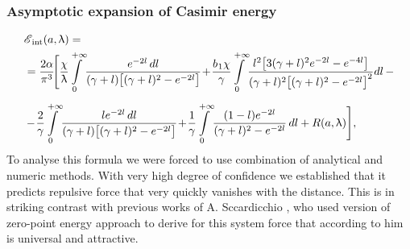 \documentclass[10pt,t]{beamer}
\begin{document}
\begin{frame}
  \frametitle{Asymptotic expansion of Casimir energy}

  \vspace{-2em}


  \begin{equation}
    \label{eq:Rescaled-version-of-the-model-05}
    \begin{split}
      &\EInt( a, \lambda ) = \\
      &=
        \frac{ 2 \alpha }{ \pi^{ 3 } } \! \Bigg[ \frac{ \chi }{ \lambda } \!
        \int\limits_{ 0 }^{ +\infty } \!
        \frac{ e^{ -2 l } \, dl }{ ( \gamma + l )
        \big[ ( \gamma + l )^{ 2 } - e^{ -2 l } \big] } \! + \!
        \frac{ b_{ \HorSpaceOne 1 } \chi }{ \gamma } \!
        \int\limits_{ 0 }^{ +\infty } \!
        \frac{ l^{ 2 } \big[ 3 ( \gamma + l )^{ 2 } e^{ -2 l } -
        e^{ -4 l } \big] }
        { ( \gamma + l )^{ 2 }
        \big[ ( \gamma + l )^{ 2 } - e^{ -2 l } \big]^{ 2 } } dl
        \, - \\[0.5em]
      &- \! \frac{ 2 }{ \gamma } \! \int\limits_{ 0 }^{ +\infty } \!
        \frac{ l e^{ -2 l }\, dl }{ ( \gamma + l )
        \big[ ( \gamma + l )^{ 2 } - e^{ -2 l } \big] } \! + \!
        \frac{ 1 }{ \gamma } \!
        \int\limits_{ 0 }^{ +\infty } \! \frac{ ( 1 - l ) e^{ -2 l } }{
        ( \gamma + l )^{ 2 } - e^{ -2 l } } \, dl + R( a, \lambda ) \Bigg],
    \end{split}
  \end{equation}
  To analyse this formula we were forced to use combination of analytical
  and numeric methods. With very high degree of confidence we established
  that it predicts repulsive force that very quickly vanishes with the
  distance. This is in striking contrast with previous works of A.
  Sccardicchio \parencite{Scardicchio-Casimir-dynamics-ETC-2005}, who used
  version of zero-point energy approach to derive for this system force
  that according to him is \alert{universal} and \alert{attractive}.

\end{frame}
\end{document}
